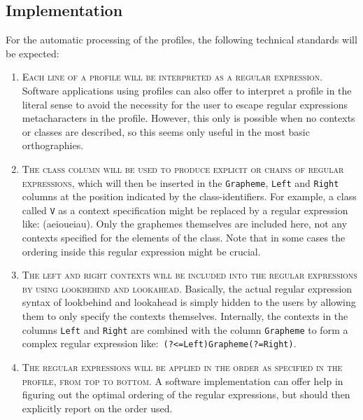 \subsection*{Implementation}
For the automatic processing of the profiles, the following technical standards
will be expected:

\begin{enumerate}
	\def\labelenumi{B\arabic{enumi}.} 
	\item \textsc{Each line of a profile will be interpreted as a regular
       expression. }Software applications using profiles can also offer to
       interpret a profile in the literal sense to avoid the necessity for the
       user to escape regular expressions metacharacters in the profile.
       However, this only is possible when no contexts or classes are described,
       so this seems only useful in the most basic orthographies. 
	\item \textsc{The \textsc{class} column will be used to produce explicit
       \textsc{or} chains of regular expressions}, which will then be inserted
       in the \texttt{Grapheme}, \texttt{Left} and \texttt{Right} columns at
       the position indicated by the class-identifiers. For example, a class
       called \texttt{V} as a context specification might be replaced by a regular
       expression like:
       (a\textbar{}e\textbar{}i\textbar{}o\textbar{}u\textbar{}ei\textbar{}au).
       Only the graphemes themselves are included here, not any contexts
       specified for the elements of the class. Note that in some cases the 
       ordering inside this regular expression might be crucial.
	\item \textsc{The \textsc{left} and \textsc{right} contexts will be included
       into the regular expressions by using lookbehind and lookahead}.
       Basically, the actual regular expression syntax of lookbehind and
       lookahead is simply hidden to the users by allowing them to only specify
       the contexts themselves. Internally, the contexts in the columns
       \texttt{Left} and \texttt{Right} are combined with the column
       \texttt{Grapheme} to form a complex regular expression like:\ 
       \texttt{(?\textless{}=Left)Grapheme(?=Right)}. 
	\item \textsc{The regular expressions will be applied in the order as specified
       in the profile, from top to bottom.} A software implementation can offer
       help in figuring out the optimal ordering of the regular expressions, but
       should then explicitly report on the order used.      
\end{enumerate}


